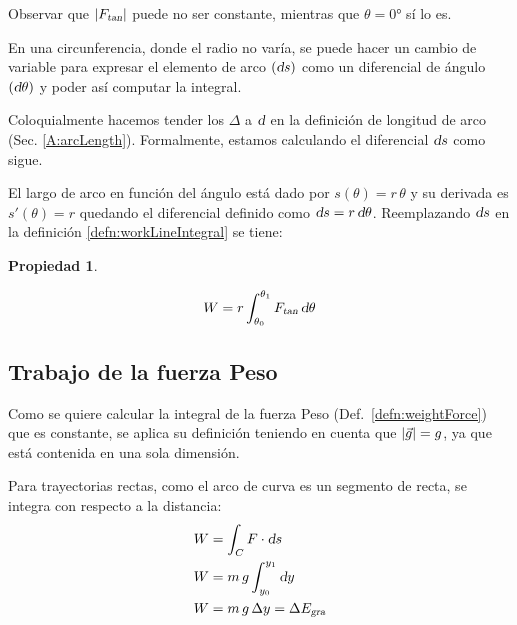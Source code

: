 \documentclass[a5paper,12pt,twoside]{book}
\newtheorem{prop}{{Propiedad}}[chapter]
\begin{document}
Observar que ${\left| {{{F}_\textsl{{tan}}}} \right|}$ puede no ser constante, mientras que $\theta=\ang{0}$ sí lo es.

En una circunferencia, donde el radio no varía, se puede hacer un cambio de variable para expresar el elemento de arco $(\textsl{d} s)$ como un diferencial de ángulo $(\textsl{d} \theta)$ y poder así computar la integral.

Coloquialmente hacemos tender los $\Delta$ a $\textsl{d}$ en la definición de longitud de arco (Sec. \ref{A:arcLength}).
Formalmente, estamos calculando el diferencial $\textsl{d} s$ como sigue.

El largo de arco en función del ángulo está dado por $s(\theta) = r \, \theta$ y su derivada es $s'(\theta) = r$ quedando el diferencial definido como $\textsl{d} s = r \, \textsl{d} \theta$.
Reemplazando $\textsl{d} s$ en la definición \ref{defn:workLineIntegral} se tiene:

\begin{mdframed}[style=MyFrame1]
    \begin{prop}
        \label{prop:workOnCircumference}
    \end{prop}
    \begin{equation*}
        W = r \int_{\theta_0}^{\theta_1} {{F}_\textsl{{tan}}} \, \textsl{d} \theta
    \end{equation*}
\end{mdframed}


\subsection{Trabajo de la fuerza Peso}

Como se quiere calcular la integral de la fuerza Peso (Def.\ \ref{defn:weightForce}) que es constante, se aplica su definición teniendo en cuenta que ${\left| {\Vec{g}} \right|} = g$, ya que está contenida en una sola dimensión.

\begin{center}
    \def\svgwidth{0.8\linewidth}
    
\end{center}

Para trayectorias rectas, como el arco de curva es un segmento de recta, se integra con respecto a la distancia:
\begin{align*}
    W &= \int_C F \cdot \textsl{d} s
    \\
    W &= m \, g \int_{y_0}^{y_1} \textsl{d} y
    \\
    W &= m \, g \, \Delta y = \Delta {{E}_\textsl{{gra}}}
\end{align*}
\end{document}
